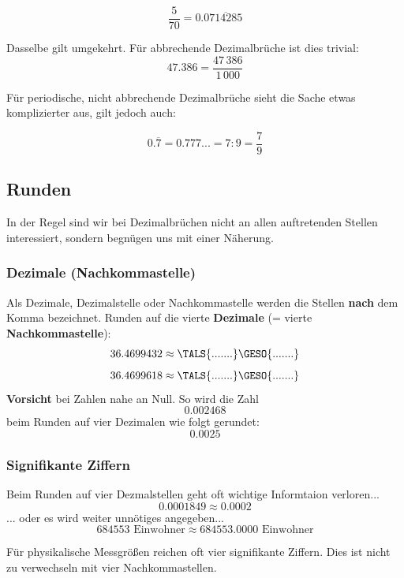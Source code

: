 $$\frac{5}{70} = 0.0\overline{714285}$$

Dasselbe gilt umgekehrt. Für abbrechende Dezimalbrüche ist dies
trivial:
$$47.386 = \frac{47\,386}{1\,000}$$

Für periodische, nicht abbrechende Dezimalbrüche sieht die Sache etwas komplizierter aus,
gilt jedoch auch:

$$0.\overline{7} = 0.777... = 7: 9 = \frac{7}{9}$$


\newpage


\subsection{Runden}
In der Regel sind wir bei Dezimalbrüchen nicht an allen auftretenden
Stellen interessiert, sondern begnügen uns mit einer Näherung.

\subsubsection{Dezimale (Nachkommastelle)}
Als Dezimale, Dezimalstelle oder Nachkommastelle werden die Stellen \textbf{nach} dem Komma bezeichnet.
Runden auf die vierte \textbf{Dezimale} (= vierte \textbf{Nachkommastelle}):
$$ 36.4699432 \approx  \TALS{.......}\GESO{.......}$$
$$ 36.4699618 \approx\TALS{.......}\GESO{.......}$$
\textbf{Vorsicht} bei Zahlen nahe an Null. So wird die Zahl
$$0.002468$$ beim Runden auf vier Dezimalen wie folgt gerundet:
$$0.0025$$
\newpage


\subsubsection{Signifikante Ziffern}
Beim Runden auf vier Dezmalstellen geht oft wichtige Informtaion verloren...
$$ 0.0001849 \approx  0.0002$$
... oder es wird weiter unnötiges angegeben...
$$ 684553 \textrm{\ Einwohner} \approx  684553.0000 \textrm{\ Einwohner}$$

Für physikalische Messgrößen reichen oft vier
signifikante
Ziffern. Dies ist nicht zu verwechseln mit vier Nachkommastellen.


